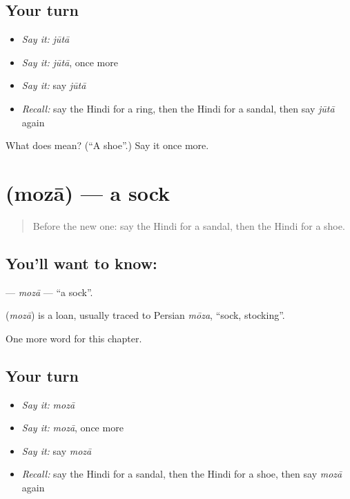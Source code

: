 \subsection*{Your turn}
\begin{itemize}
\raggedright
  \item \emph{Say it:} \emph{jūtā}
  \item \emph{Say it:} \emph{jūtā}, once more
  \item \emph{Say it:} say \emph{jūtā}
  \item \emph{Recall:} say the Hindi for a ring, then the Hindi for a sandal, then say \emph{jūtā} again
\end{itemize}

\begin{tcolorbox}[breakable,colback=teal!4,colframe=teal!35!black,title={Before you move on}]
What does  mean? (\textquotedblleft{}A shoe\textquotedblright{}.) Say it once more.
\end{tcolorbox}
\section[\texorpdfstring{\hi{मोज़ा} (mozā)}{मोज़ा (mozā)}]{ (mozā) — a sock}

\label{lesson:HI-C135-moza}



\begin{quote}
Before the new one: say the Hindi for a sandal, then the Hindi for a shoe.
\end{quote}

\subsection*{You'll want to know: }
\textbf{} — \emph{mozā} — \textquotedblleft{}a sock\textquotedblright{}.

\begin{cousinweb}
\textbf{} (\emph{mozā}) is a loan, usually traced to Persian \emph{mōza}, \textquotedblleft{}sock, stocking\textquotedblright{}.
\end{cousinweb}

\begin{grammarlens}[title={What you've built}]
One more word for this chapter.
\end{grammarlens}

\subsection*{Your turn}
\begin{itemize}
\raggedright
  \item \emph{Say it:} \emph{mozā}
  \item \emph{Say it:} \emph{mozā}, once more
  \item \emph{Say it:} say \emph{mozā}
  \item \emph{Recall:} say the Hindi for a sandal, then the Hindi for a shoe, then say \emph{mozā} again
\end{itemize}

